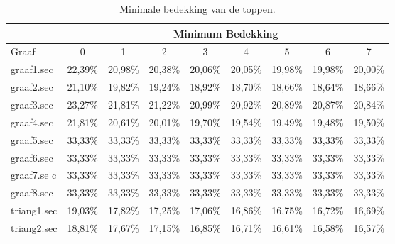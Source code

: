 \documentclass[11pt, a4paper, table]{article}
\theoremstyle{definition}
\begin{document}
\begin{table}
	\centering
	\begin{tabular}{|l|c|c|c|c|c|c|c|c|}
		\hline
		& \multicolumn{8}{c|}{Minimum Bedekking}		\\ \hline
		Graaf & 0  & 1  & 2  & 3  & 4  & 5  & 6  & 7 		\\ \hline
		graaf1.sec & 22,39\% & 20,98\% & 20,38\% & 20,06\% & 20,05\% &  \cellcolor{LimeGreen}19,98\% & 19,98\% & 20,00\%		\\ \hline
		graaf2.sec & 21,10\% & 19,82\% & 19,24\% & 18,92\% & 18,70\% & 18,66\% &  \cellcolor{LimeGreen}18,64\% & 18,66\%		\\ \hline
		graaf3.sec & 23,27\% & 21,81\% & 21,22\% & 20,99\% & 20,92\% & 20,89\% & 20,87\% &  \cellcolor{LimeGreen}20,84\%		\\ \hline
		graaf4.sec & 21,81\% & 20,61\% & 20,01\% & 19,70\% & 19,54\% & 19,49\% &  \cellcolor{LimeGreen}19,48\% & 19,50\%		\\ \hline
		graaf5.sec &  \cellcolor{LimeGreen}33,33\% & 33,33\% & 33,33\% & 33,33\% & 33,33\% & 33,33\% & 33,33\% & 33,33\%		\\ \hline
		graaf6.sec &  \cellcolor{LimeGreen}33,33\% & 33,33\% & 33,33\% & 33,33\% & 33,33\% & 33,33\% & 33,33\% & 33,33\%		\\ \hline
		graaf7.se c &  \cellcolor{LimeGreen}33,33\% & 33,33\% & 33,33\% & 33,33\% & 33,33\% & 33,33\% & 33,33\% & 33,33\%		\\ \hline
		graaf8.sec &  \cellcolor{LimeGreen}33,33\% & 33,33\% & 33,33\% & 33,33\% & 33,33\% & 33,33\% & 33,33\% & 33,33\%		\\ \hline
		triang1.sec & 19,03\% & 17,82\% & 17,25\% & 17,06\% & 16,86\% & 16,75\% & 16,72\% &  \cellcolor{LimeGreen}16,69\%		\\ \hline
		triang2.sec & 18,81\% & 17,67\% & 17,15\% & 16,85\% & 16,71\% & 16,61\% & 16,58\% &  \cellcolor{LimeGreen}16,57\%		\\ \hline
	\end{tabular}
	\caption{Minimale bedekking van de toppen.}
	\label{tabel:bedekking1}
\end{table}
\end{document}
